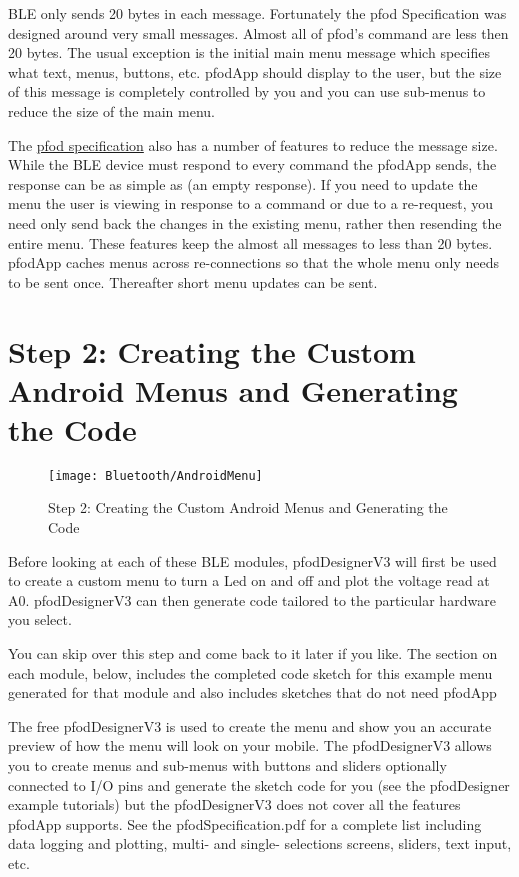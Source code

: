 BLE only sends 20 bytes in each message. Fortunately the pfod Specification was designed around very small messages. Almost all of pfod's command are less then 20 bytes. The usual exception is the initial main menu message which specifies what text, menus, buttons, etc. pfodApp should display to the user, but the size of this message is completely controlled by you and you can use sub-menus to reduce the size of the main menu.
    
The \href{https://www.forward.com.au/pfod/pfodSpecification.pdf}{pfod specification} also has a number of features to reduce the message size. While the BLE device must respond to every command the pfodApp sends, the response can be as simple as {} (an empty response). If you need to update the menu the user is viewing in response to a command or due to a re-request, you need only send back the changes in the existing menu, rather then resending the entire menu. These features keep the almost all messages to less than 20 bytes. pfodApp caches menus across re-connections so that the whole menu only needs to be sent once. Thereafter short menu updates can be sent.


\section{Step 2: Creating the Custom Android Menus and Generating the Code}
\begin{figure}
    \texttt{[image: Bluetooth/AndroidMenu]}
    \caption{Step 2: Creating the Custom Android Menus and Generating the Code}    
\end{figure}

Before looking at each of these BLE modules, pfodDesignerV3 will first be used to create a custom menu to turn a Led on and off and plot the voltage read at A0. pfodDesignerV3 can then generate code tailored to the particular hardware you select.

You can skip over this step and come back to it later if you like. The section on each module, below, includes the completed code sketch for this example menu generated for that module and also includes sketches that do not need pfodApp

The free pfodDesignerV3 is used to create the menu and show you an accurate preview of how the menu will look on your mobile. The pfodDesignerV3 allows you to create menus and sub-menus with buttons and sliders optionally connected to I/O pins and generate the sketch code for you (see the pfodDesigner example tutorials) but the pfodDesignerV3 does not cover all the features pfodApp supports. See the pfodSpecification.pdf for a complete list including data logging and plotting, multi- and single- selections screens, sliders, text input, etc.

